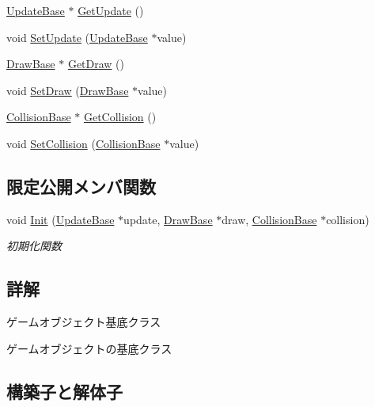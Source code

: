 \begin{DoxyCompactItemize}
\item 
\mbox{\hyperlink{class_update_base}{Update\+Base}} $\ast$ \mbox{\hyperlink{class_game_object_base_a177985be1be1252df6588fa29f2c7f41}{Get\+Update}} ()
\item 
void \mbox{\hyperlink{class_game_object_base_a71704e8310b3183f3f88869f8fd27d08}{Set\+Update}} (\mbox{\hyperlink{class_update_base}{Update\+Base}} $\ast$value)
\item 
\mbox{\hyperlink{class_draw_base}{Draw\+Base}} $\ast$ \mbox{\hyperlink{class_game_object_base_acb893b1827cb7fbb27f0caf6a8e0fb88}{Get\+Draw}} ()
\item 
void \mbox{\hyperlink{class_game_object_base_ab548b4208b8da2af6e3abb533ea53da9}{Set\+Draw}} (\mbox{\hyperlink{class_draw_base}{Draw\+Base}} $\ast$value)
\item 
\mbox{\hyperlink{class_collision_base}{Collision\+Base}} $\ast$ \mbox{\hyperlink{class_game_object_base_a8158138ea811db49445845d8aaacaf3a}{Get\+Collision}} ()
\item 
void \mbox{\hyperlink{class_game_object_base_a4aeb0212f5a390570d050bfef51b7818}{Set\+Collision}} (\mbox{\hyperlink{class_collision_base}{Collision\+Base}} $\ast$value)
\end{DoxyCompactItemize}
\subsection*{限定公開メンバ関数}
\begin{DoxyCompactItemize}
\item 
void \mbox{\hyperlink{class_game_object_base_aca14cf5d66f945347653c4965876e75b}{Init}} (\mbox{\hyperlink{class_update_base}{Update\+Base}} $\ast$update, \mbox{\hyperlink{class_draw_base}{Draw\+Base}} $\ast$draw, \mbox{\hyperlink{class_collision_base}{Collision\+Base}} $\ast$collision)
\begin{DoxyCompactList}\small\item\em 初期化関数 \end{DoxyCompactList}\end{DoxyCompactItemize}


\subsection{詳解}
ゲームオブジェクト基底クラス 

ゲームオブジェクトの基底クラス 

\subsection{構築子と解体子}
\mbox{\label{class_game_object_base_a4682a3e88a45a462de288f14e9a8545d}} 
